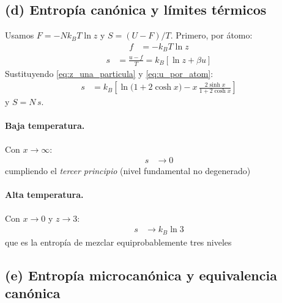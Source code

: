 \documentclass{article}
\begin{document}
\subsection*{(d) Entropía canónica y límites térmicos}

Usamos $F=-Nk_B T\ln z$ y $S=(U-F)/T$. Primero, por átomo:
\begin{equation}
\begin{split}
f
&= -k_B T\ln z
\end{split}\label{eq:f_por_atom}
\end{equation}
\begin{equation}
\begin{split}
s
&= \frac{u-f}{T}
= k_B\left[\ln z+\beta u\right]
\end{split}\label{eq:s_por_atom_base}
\end{equation}
Sustituyendo \eqref{eq:z_una_particula} y \eqref{eq:u_por_atom}:
\begin{equation}
\begin{split}
s
&= k_B\left[
\ln\!\big(1+2\cosh x\big)
- x\,\frac{2\sinh x}{1+2\cosh x}
\right]
\end{split}\label{eq:s_por_atom}
\end{equation}
y $S=N\,s$.

\paragraph{Baja temperatura.} Con $x\to\infty$:
\begin{equation}
\begin{split}
s
&\to 0
\end{split}\label{eq:s_T0}
\end{equation}
cumpliendo el \textit{tercer principio} (nivel fundamental no degenerado)

\paragraph{Alta temperatura.} Con $x\to 0$ y $z\to 3$:
\begin{equation}
\begin{split}
s
&\to k_B\ln 3
\end{split}\label{eq:s_Th}
\end{equation}
que es la entropía de mezclar equiprobablemente tres niveles

\subsection*{(e) Entropía microcanónica y equivalencia canónica}
\end{document}
